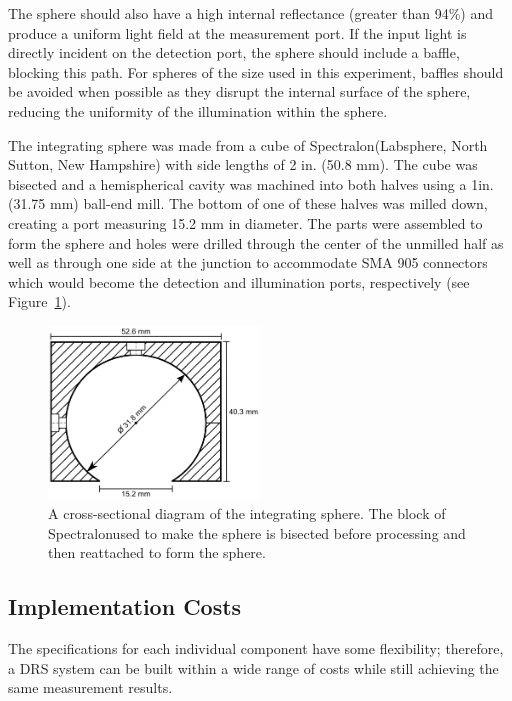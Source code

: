 The sphere should also have a high internal reflectance (greater than 94\%) and produce a uniform light field at the measurement port.\cite{Labsphereb,Labspherea,Labsphere} If the input light is directly incident on the detection port, the sphere should include a baffle, blocking this path. For spheres of the size used in this experiment, baffles should be avoided when possible as they disrupt the internal surface of the sphere, reducing the uniformity of the illumination within the sphere.

The integrating sphere was made from a cube of Spectralon\textregistered (Labsphere\textregistered, North Sutton, New Hampshire) with side lengths of 2 in. (50.8 mm). The cube was bisected and a hemispherical cavity was machined into both halves using a 1\textonequarter in. (31.75 mm) ball-end mill. The bottom of one of these halves was milled down, creating a port measuring 15.2 mm in diameter. The parts were assembled to form the sphere and holes were drilled through the center of the unmilled half as well as through one side at the junction to accommodate SMA 905 connectors which would become the detection and illumination ports, respectively (see Figure~\ref{fig:p1-intsphere_schematic}).

\begin{figure}
	\centering \includegraphics[width=0.5\textwidth]{figures/p1-intsphere_schematic.png}
	\caption[Cross-sectional diagram of the integrating sphere]{\label{fig:p1-intsphere_schematic}A cross-sectional diagram of the integrating sphere. The block of Spectralon\textregistered used to make the sphere is bisected before processing and then reattached to form the sphere.}
\end{figure}

\subsection{Implementation Costs}
The specifications for each individual component have some flexibility; therefore, a DRS system can be built within a wide range of costs while still achieving the same measurement results.

